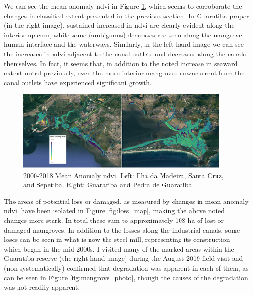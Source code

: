 We can see the mean anomaly \ac{ndvi} in Figure \ref{fig:mean_anomaly_map}, which seems to corroborate the changes in classified extent presented in the previous section. In Guaratiba proper (in the right image), sustained increased in \ac{ndvi} are clearly evident along the interior apicum, while some (ambiguous) decreases are seen along the mangrove-human interface and the waterways. Similarly, in the left-hand image we can see the increases in \ac{ndvi} adjacent to the canal outlets and decreases along the canals themselves. In fact, it seems that, in addition to the noted increase in seaward extent noted previously, even the more interior mangroves downcurrent from the canal outlets have experienced significant growth. 

\begin{figure}[H] 
\centering
\includegraphics[width=0.95\textwidth]{Figures/chap4/mean_anomaly_map.png}
\caption[2000-2018 Mean Anomaly NDVI of Region]{2000-2018 Mean Anomaly \ac{ndvi}. Left: Ilha da Madeira, Santa Cruz, and Sepetiba. Right: Guaratiba and Pedra de Guaratiba.}
\label{fig:mean_anomaly_map}
\end{figure}

The areas of potential loss or damaged, as measured by changes in mean anomaly \ac{ndvi}, have been isolated in Figure \ref{fig:loss_map}, making the above noted changes more stark. In total these sum to approximately 108 ha of lost or damaged mangroves. In addition to the losses along the industrial canals, some loses can be seen in what is now the steel mill, representing its construction which began in the mid-2000s.  I visited many of the marked areas within the Guaratiba reserve (the right-hand image) during the August 2019 field visit and (non-systematically) confirmed that degradation was apparent in each of them, as can be seen in Figure \ref{fig:mangrove_photo}, though the causes of the degradation was not readily apparent.

